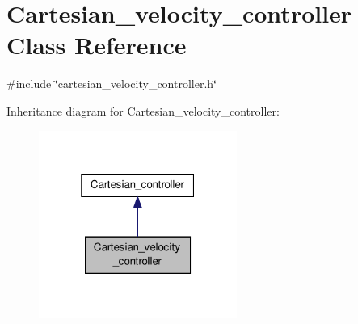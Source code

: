 \hypertarget{classCartesian__velocity__controller}{\section{Cartesian\-\_\-velocity\-\_\-controller Class Reference}
\label{classCartesian__velocity__controller}
}


{\ttfamily \#include \char`\"{}cartesian\-\_\-velocity\-\_\-controller.\-h\char`\"{}}



Inheritance diagram for Cartesian\-\_\-velocity\-\_\-controller\-:\nopagebreak
\begin{figure}[H]
\begin{center}
\leavevmode
\includegraphics[width=184pt]{classCartesian__velocity__controller__inherit__graph}
\end{center}
\end{figure}


